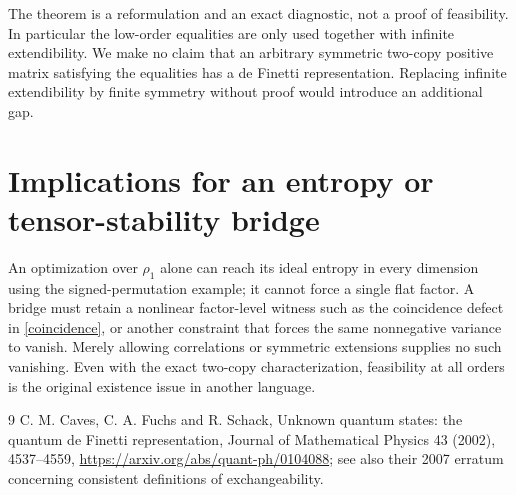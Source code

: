 \documentclass[11pt]{article}
\begin{document}
The theorem is a reformulation and an exact diagnostic, not a proof
of feasibility. In particular the low-order equalities are only used
together with infinite extendibility. We make no claim that an
arbitrary symmetric two-copy positive matrix satisfying the equalities
has a de Finetti representation. Replacing infinite extendibility by
finite symmetry without proof would introduce an additional gap.

\section{Implications for an entropy or tensor-stability bridge}
An optimization over $\rho_1$ alone can reach its ideal entropy in
every dimension using the signed-permutation example; it cannot
force a single flat factor. A bridge must retain a nonlinear
factor-level witness such as the coincidence defect in
\eqref{coincidence}, or another constraint that forces the same
nonnegative variance to vanish. Merely allowing correlations or
symmetric extensions supplies no such vanishing. Even with the exact
two-copy characterization, feasibility at all orders is the original
existence issue in another language.

\begin{thebibliography}{9}
 C. M. Caves, C. A. Fuchs and R. Schack,
Unknown quantum states: the quantum de Finetti representation,
Journal of Mathematical Physics 43 (2002), 4537--4559,
\url{https://arxiv.org/abs/quant-ph/0104088}; see also their 2007
erratum concerning consistent definitions of exchangeability.
\end{thebibliography}
\end{document}
